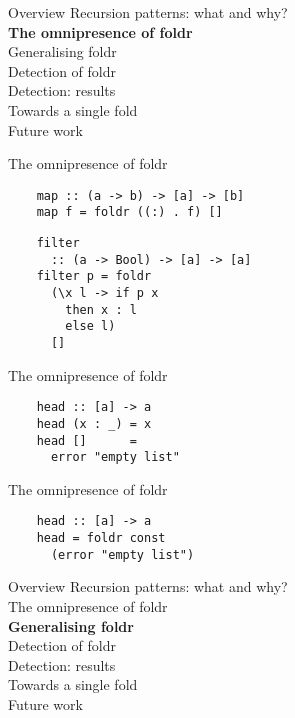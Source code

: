 \documentclass[20pt]{beamer}
\begin{document}

\begin{frame}{Overview}
    Recursion patterns: what and why? \\
    \textbf{The omnipresence of foldr} \\
    Generalising foldr \\
    Detection of foldr \\
    Detection: results \\
    Towards a single fold \\
    Future work \\
\end{frame}

\begin{frame}[fragile]{The omnipresence of foldr}
    \begin{lstlisting}
    map :: (a -> b) -> [a] -> [b]
    map f = foldr ((:) . f) []
    \end{lstlisting}

    \begin{lstlisting}
    filter
      :: (a -> Bool) -> [a] -> [a]
    filter p = foldr
      (\x l -> if p x
        then x : l
        else l)
      []
    \end{lstlisting}
\end{frame}

\begin{frame}[fragile]{The omnipresence of foldr}
    \begin{lstlisting}
    head :: [a] -> a
    head (x : _) = x
    head []      =
      error "empty list"
    \end{lstlisting}
\end{frame}

\begin{frame}[fragile]{The omnipresence of foldr}
    \begin{lstlisting}
    head :: [a] -> a
    head = foldr const
      (error "empty list")
    \end{lstlisting}
\end{frame}


\begin{frame}{Overview}
    Recursion patterns: what and why? \\
    The omnipresence of foldr \\
    \textbf{Generalising foldr} \\
    Detection of foldr \\
    Detection: results \\
    Towards a single fold \\
    Future work \\
\end{frame}
\end{document}
